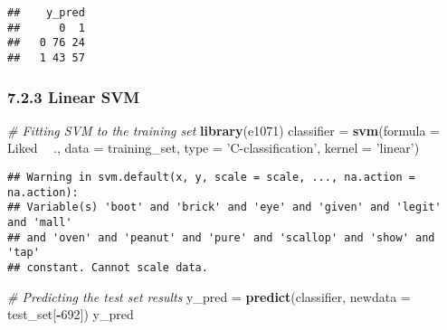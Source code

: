 \documentclass[]{article}
\newenvironment{Shaded}{\begin{snugshade}}{\end{snugshade}}
\newcommand{\CommentTok}[1]{\textcolor[rgb]{0.56,0.35,0.01}{\textit{#1}}}
\newcommand{\DataTypeTok}[1]{\textcolor[rgb]{0.13,0.29,0.53}{#1}}
\newcommand{\DecValTok}[1]{\textcolor[rgb]{0.00,0.00,0.81}{#1}}
\newcommand{\KeywordTok}[1]{\textcolor[rgb]{0.13,0.29,0.53}{\textbf{#1}}}
\newcommand{\NormalTok}[1]{#1}
\newcommand{\OperatorTok}[1]{\textcolor[rgb]{0.81,0.36,0.00}{\textbf{#1}}}
\newcommand{\StringTok}[1]{\textcolor[rgb]{0.31,0.60,0.02}{#1}}
\begin{document}
\begin{verbatim}
##    y_pred
##      0  1
##   0 76 24
##   1 43 57
\end{verbatim}

\hypertarget{linear-svm}{%
\subsubsection{7.2.3 Linear SVM}\label{linear-svm}}

\begin{Shaded}
\begin{Highlighting}[]
\CommentTok{# Fitting SVM to the training set}
\KeywordTok{library}\NormalTok{(e1071)}
\NormalTok{classifier =}\StringTok{ }\KeywordTok{svm}\NormalTok{(}\DataTypeTok{formula =}\NormalTok{ Liked }\OperatorTok{~}\StringTok{ }\NormalTok{., }
                 \DataTypeTok{data =}\NormalTok{ training_set, }
                 \DataTypeTok{type =} \StringTok{'C-classification'}\NormalTok{, }
                 \DataTypeTok{kernel =} \StringTok{'linear'}\NormalTok{)}
\end{Highlighting}
\end{Shaded}

\begin{verbatim}
## Warning in svm.default(x, y, scale = scale, ..., na.action = na.action):
## Variable(s) 'boot' and 'brick' and 'eye' and 'given' and 'legit' and 'mall'
## and 'oven' and 'peanut' and 'pure' and 'scallop' and 'show' and 'tap'
## constant. Cannot scale data.
\end{verbatim}

\begin{Shaded}
\begin{Highlighting}[]
\CommentTok{# Predicting the test set results}
\NormalTok{y_pred =}\StringTok{ }\KeywordTok{predict}\NormalTok{(classifier, }\DataTypeTok{newdata =}\NormalTok{ test_set[}\OperatorTok{-}\DecValTok{692}\NormalTok{])}
\NormalTok{y_pred}
\end{Highlighting}
\end{Shaded}
\end{document}

